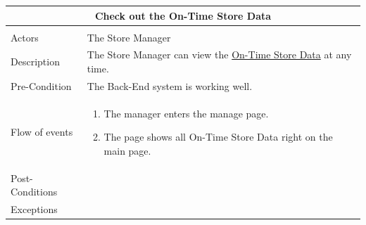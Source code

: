 \documentclass[a4paper,12pt]{report}
\begin{document}
\begin{center}
	\begin{tabular}{p{}|p{}}
		\multicolumn{2}{c}{\large \textbf{Check out the On-Time Store Data}} \\[3mm] 
		\hline \\
		Actors &   The Store Manager \\[3mm] 
		Description &  The Store Manager can view the \hyperref[Definitions]{On-Time Store Data} at any time. \\[3mm]  
		Pre-Condition & The Back-End system is working well.
		 \\[3mm] 
		Flow of events & 
		\begin{enumerate}
			\item The manager enters the manage page.
			\item The page shows all On-Time Store Data right on the main page.
		\end{enumerate}
		\\[3mm] 
		Post-Conditions & \\[3mm] 
		Exceptions & \\[3mm] 
	\end{tabular}
\end{center}
\end{document}
